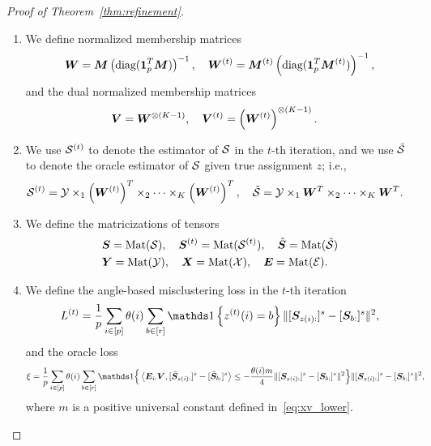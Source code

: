 \documentclass[lettersize,onecolumn,journal]{IEEEtran}
\theoremstyle{definition}
\theoremstyle{definition}
\newcommand{\of}[1]{\left(#1\right)}
\newcommand{\offf}[1]{\left\{#1\right\}}
\newcommand{\ang}[1]{\left\langle#1\right\rangle}
\begin{document}
\begin{proof}[Proof of Theorem~\ref{thm:refinement}]
\begin{enumerate}[wide]
    \item We define normalized membership matrices
    \begin{align}
        \mW = \mM \of{ \text{diag}(\mone_{p}^T \mM) }^{-1}, \quad \mW^{(t)} = \mM^{(t)} \of{ \text{diag}(\mone_{p}^T \mM^{(t)}) }^{-1},
    \end{align}
    and the dual normalized membership matrices
    \begin{align}
         \mV &= \mW^{\otimes (K-1)}, \quad \mV^{(t)} =\of{ \mW^{(t)}}^{\otimes (K-1)}.
    \end{align}
    \item We use $\mathcal{S}^{(t)}$ to denote the estimator of $\mathcal{S}$ in the $t$-th iteration, and we use $\tilde {\mathcal{S}}$ to denote the oracle estimator of $\mathcal{S}$ given true assignment $z$; i.e.,
    \begin{align}
        \tS^{(t)} = \tY \times_1 \of{\mW^{(t)}}^T \times_2 \cdots \times_K \of{\mW^{(t)}}^T, \quad \tilde \tS &= \tY \times_1 \mW^T \times_2 \cdots \times_K \mW^T.
    \end{align}
    \item We define the matricizations of tensors
    \begin{align}
        &\bm S = \text{Mat}(\mathcal{S}), \quad \bm S^{(t)} = \text{Mat}(\mathcal{S}^{(t)}), \quad \tilde {\bm S} = \text{Mat}(\tilde {\mathcal{S}})\\
        &\bm Y = \text{Mat}(\mathcal{Y}), \quad \bm X = \text{Mat}(\mathcal{X}), \quad \bm{E} = \text{Mat}(\mathcal{E}).
    \end{align}
    \item We define the angle-based misclustering loss in the $t$-th iteration 
    \begin{equation}
         L^{(t)} = \frac{1}{p}  \sum_{i \in [p]} \theta(i) \sum_{b \in [r]}  \ind \offf{ z^{(t)}(i) = b } \onormSize{}{ [ \mS_{ z(i):}  ]^s - [ \mS_{b:}  ]^s  }^2,
    \end{equation}
     and the oracle loss
    \begin{align}
         \xi & = \frac{1}{p} \sum_{i \in [p]} \theta(i) \sum_{b \in [r]} \ind \Big\{\ang{ \mE_{i:} \mV, [  \tilde \mS_{z(i):} ]^s - [  \tilde \mS_{b:} ]^s}  \leq - \frac{ \theta(i) m}{4} \onormSize{}{ [ \mS_{z(i):}  ]^s - [ \mS_{b:}  ]^s  }^2 \Big\} \onormSize{}{ [ \mS_{z(i):}  ]^s - [ \mS_{ b:}  ]^s  }^2,
    \end{align}
    where $m$ is a positive universal constant defined in~\eqref{eq:xv_lower}.
\end{enumerate}


\end{proof}
\end{document}
